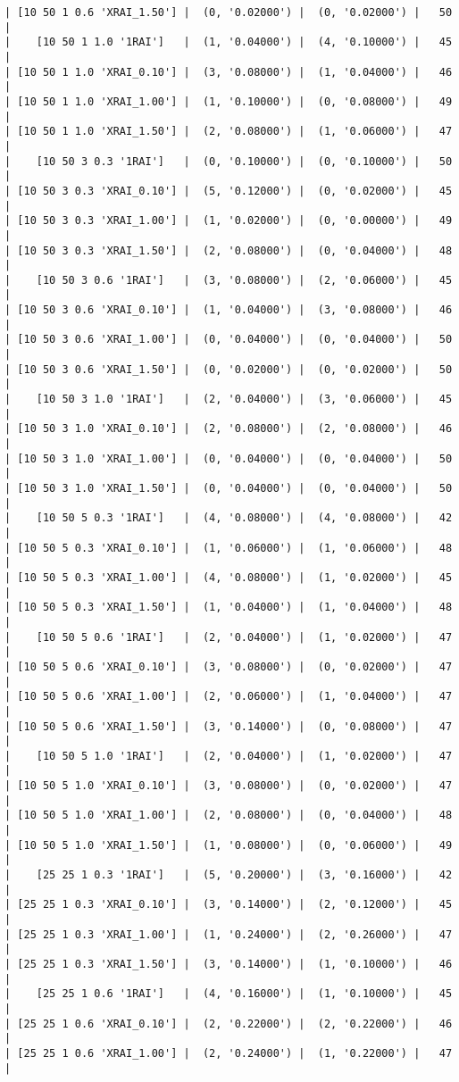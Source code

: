 \documentclass{article}
\begin{document}
\begin{verbatim}
| [10 50 1 0.6 'XRAI_1.50'] |  (0, '0.02000') |  (0, '0.02000') |   50  |
|    [10 50 1 1.0 '1RAI']   |  (1, '0.04000') |  (4, '0.10000') |   45  |
| [10 50 1 1.0 'XRAI_0.10'] |  (3, '0.08000') |  (1, '0.04000') |   46  |
| [10 50 1 1.0 'XRAI_1.00'] |  (1, '0.10000') |  (0, '0.08000') |   49  |
| [10 50 1 1.0 'XRAI_1.50'] |  (2, '0.08000') |  (1, '0.06000') |   47  |
|    [10 50 3 0.3 '1RAI']   |  (0, '0.10000') |  (0, '0.10000') |   50  |
| [10 50 3 0.3 'XRAI_0.10'] |  (5, '0.12000') |  (0, '0.02000') |   45  |
| [10 50 3 0.3 'XRAI_1.00'] |  (1, '0.02000') |  (0, '0.00000') |   49  |
| [10 50 3 0.3 'XRAI_1.50'] |  (2, '0.08000') |  (0, '0.04000') |   48  |
|    [10 50 3 0.6 '1RAI']   |  (3, '0.08000') |  (2, '0.06000') |   45  |
| [10 50 3 0.6 'XRAI_0.10'] |  (1, '0.04000') |  (3, '0.08000') |   46  |
| [10 50 3 0.6 'XRAI_1.00'] |  (0, '0.04000') |  (0, '0.04000') |   50  |
| [10 50 3 0.6 'XRAI_1.50'] |  (0, '0.02000') |  (0, '0.02000') |   50  |
|    [10 50 3 1.0 '1RAI']   |  (2, '0.04000') |  (3, '0.06000') |   45  |
| [10 50 3 1.0 'XRAI_0.10'] |  (2, '0.08000') |  (2, '0.08000') |   46  |
| [10 50 3 1.0 'XRAI_1.00'] |  (0, '0.04000') |  (0, '0.04000') |   50  |
| [10 50 3 1.0 'XRAI_1.50'] |  (0, '0.04000') |  (0, '0.04000') |   50  |
|    [10 50 5 0.3 '1RAI']   |  (4, '0.08000') |  (4, '0.08000') |   42  |
| [10 50 5 0.3 'XRAI_0.10'] |  (1, '0.06000') |  (1, '0.06000') |   48  |
| [10 50 5 0.3 'XRAI_1.00'] |  (4, '0.08000') |  (1, '0.02000') |   45  |
| [10 50 5 0.3 'XRAI_1.50'] |  (1, '0.04000') |  (1, '0.04000') |   48  |
|    [10 50 5 0.6 '1RAI']   |  (2, '0.04000') |  (1, '0.02000') |   47  |
| [10 50 5 0.6 'XRAI_0.10'] |  (3, '0.08000') |  (0, '0.02000') |   47  |
| [10 50 5 0.6 'XRAI_1.00'] |  (2, '0.06000') |  (1, '0.04000') |   47  |
| [10 50 5 0.6 'XRAI_1.50'] |  (3, '0.14000') |  (0, '0.08000') |   47  |
|    [10 50 5 1.0 '1RAI']   |  (2, '0.04000') |  (1, '0.02000') |   47  |
| [10 50 5 1.0 'XRAI_0.10'] |  (3, '0.08000') |  (0, '0.02000') |   47  |
| [10 50 5 1.0 'XRAI_1.00'] |  (2, '0.08000') |  (0, '0.04000') |   48  |
| [10 50 5 1.0 'XRAI_1.50'] |  (1, '0.08000') |  (0, '0.06000') |   49  |
|    [25 25 1 0.3 '1RAI']   |  (5, '0.20000') |  (3, '0.16000') |   42  |
| [25 25 1 0.3 'XRAI_0.10'] |  (3, '0.14000') |  (2, '0.12000') |   45  |
| [25 25 1 0.3 'XRAI_1.00'] |  (1, '0.24000') |  (2, '0.26000') |   47  |
| [25 25 1 0.3 'XRAI_1.50'] |  (3, '0.14000') |  (1, '0.10000') |   46  |
|    [25 25 1 0.6 '1RAI']   |  (4, '0.16000') |  (1, '0.10000') |   45  |
| [25 25 1 0.6 'XRAI_0.10'] |  (2, '0.22000') |  (2, '0.22000') |   46  |
| [25 25 1 0.6 'XRAI_1.00'] |  (2, '0.24000') |  (1, '0.22000') |   47  |

\end{verbatim}
\end{document}
